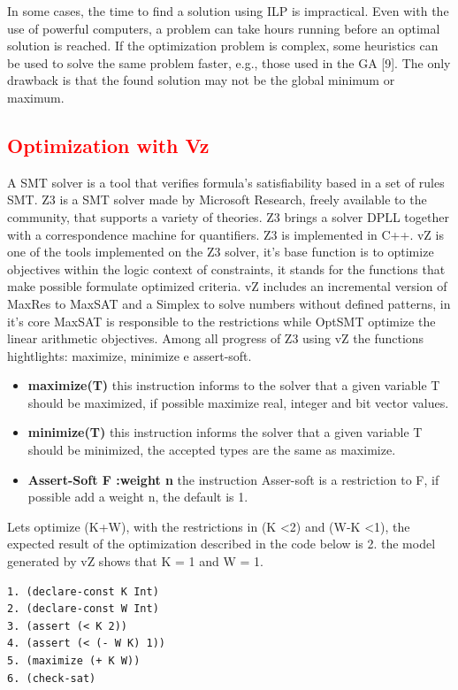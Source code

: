 In some cases, the time to find a solution using ILP is impractical. Even with the use of powerful computers, a problem can take hours running before an optimal solution is reached. If the optimization problem is complex, some heuristics can be used to solve the same problem faster, e.g., those used in the GA [9]. The only drawback is that the found solution may not be the global minimum or maximum.

\subsection{\textcolor{Red}{Optimization with Vz}}
A SMT solver is a tool that verifies formula's satisfiability based in a set of rules SMT. Z3 is a SMT solver made by Microsoft Research, freely available to the community, that supports a variety of theories. Z3 brings a solver DPLL together with a correspondence machine for quantifiers. Z3 is implemented in C++.
vZ is one of the tools implemented on the Z3 solver, it's base function is to optimize objectives within the logic context of constraints, it stands for the functions that make possible formulate optimized criteria.
vZ includes an incremental version of MaxRes to MaxSAT and a Simplex to solve numbers without defined patterns, in it's core MaxSAT is responsible to the restrictions while OptSMT optimize the linear arithmetic objectives.
Among all progress of Z3 using vZ the functions hightlights: maximize, minimize e assert-soft.

\begin{itemize}
\item{\textbf{maximize(T)}
this instruction informs to the solver that a given variable T should be maximized, if possible maximize real, integer and bit vector values.}
\item{\textbf{minimize(T)}
this instruction informs the solver that a given variable T should be minimized, the accepted types are the same as maximize.}
\item{\textbf{Assert-Soft F :weight n}
the instruction Asser-soft is a restriction to F, if possible add a weight n, the default is 1.}
\end{itemize}

Lets optimize (K+W), with the restrictions in (K \textless 2) and (W-K \textless 1), the expected result of the optimization described in the code below is 2. the model generated by vZ shows that K = 1 and W = 1.

\begin{lstlisting}
1. (declare-const K Int) 
2. (declare-const W Int)
3. (assert (< K 2)) 
4. (assert (< (- W K) 1))
5. (maximize (+ K W)) 
6. (check-sat)
\end{lstlisting}


